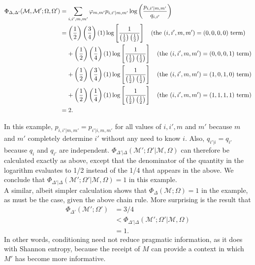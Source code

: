 \documentclass[11pt]{article}
\begin{document}
\begin{align*}
\Phi_{\Delta, \Delta'} (\mathcal M, \mathcal M'; \Omega, \Omega')
		&= \sum_{i, i', m, m'} \varphi_{m, m'}  p_{i, i'|m, m'} \log \left(\frac{p_{i,i'|m, m'}}{q_{i,i'}}\right)\\
           &=\left(\frac{1}{2}\right) \left(\frac{3}{4}\right) (1) \log\left[ \frac{1}{\left(\frac{1}{2}\right) \left(\frac{1}{2}\right)}\right] 
                \ \ \textrm{ (the $(i, i', m, m') = (0, 0, 0, 0)$ term)} \\
           &\hphantom{=\ } +\left(\frac{1}{2}\right) \left(\frac{1}{4}\right) (1) \log\left[ \frac{1}{\left(\frac{1}{2}\right) \left(\frac{1}{2}\right)}\right] 
                \ \ \textrm{ (the $(i, i', m, m') = (0, 0, 0, 1)$ term)} \\
           &\hphantom{=\ } +\left(\frac{1}{2}\right) \left(\frac{3}{4}\right) (1) \log\left[ \frac{1}{\left(\frac{1}{2}\right) \left(\frac{1}{2}\right)}\right] 
                \ \ \textrm{ (the $(i, i', m, m') = (1, 0, 1, 0)$ term)} \\
           &\hphantom{=\ } +\left(\frac{1}{2}\right) \left(\frac{1}{4}\right) (1) \log\left[ \frac{1}{\left(\frac{1}{2}\right) \left(\frac{1}{2}\right)}\right] 
                \ \ \textrm{ (the $(i, i', m, m') = (1, 1, 1, 1)$ term)} \\
           &= 2.
\end{align*}

In this example, $p_{i, i'|m, m'} = p_{i' |i, m, m'}$ for all values of $i, i', m$ and $m'$ because $m$ and $m'$ completely determine $i'$ without any need 
to know $i$.  Also, $q_{i'|i} = q_{i'}$
because $q_i$ and $q_{i'}$ are independent.  $\Phi_{\Delta'| \Delta} (\mathcal M'; \Omega' | \mathcal M, \Omega)$ can therefore be calculated 
exactly as above, except that the denominator of the quantity in the logarithm evaluates to 1/2 instead of the 1/4 that appears in the above.  
We conclude that $\Phi_{\Delta'| \Delta} (\mathcal M'; \Omega' | \mathcal M, \Omega) = 1$ in this example.\\

A similar, albeit simpler calculation shows that $\Phi_\Delta (\mathcal M; \Omega) = 1$ in the example, as must be the case, given the above chain rule.
More surprising is the result that 
\begin{align*}
\Phi_{\Delta'} (\mathcal M'; \Omega') &= 3/4\\
                                                      &< \Phi_{\Delta'| \Delta} (\mathcal M'; \Omega' | \mathcal M, \Omega) \\
                                                      &=1.
\end{align*}
In other words, conditioning need not reduce pragmatic information, as it does with Shannon entropy, because the receipt of $M$ can provide a context in which $M'$ has become more informative.
\end{document}
